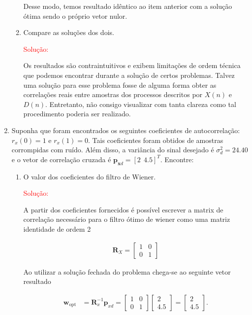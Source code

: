 \documentclass[a4paper,10pt]{article}
\begin{document}
\begin{enumerate}
\begin{enumerate}
						Desse modo, temos resultado idêntico ao item anterior com a solução ótima sendo o próprio vetor nulor.

					\item Compare as soluções dos dois.
					
						\textcolor{red}{Solução:} 

						Os resultados são contraintuitivos e exibem limitações de ordem técnica que podemos encontrar durante a solução de certos problemas. Talvez uma
						solução para esse problema fosse de alguma forma obter as correlações reais entre amostras dos processos descritos por $X(n)$ e $D(n)$. Entretanto, não
						consigo visualizar com tanta clareza como tal procedimento poderia ser realizado.
					
				\end{enumerate}
			
			\item Suponha que foram encontrados os seguintes coeficientes de autocorrelação: $r_x(0) = 1$ e $r_x(1) = 0$. Tais coeficientes foram obtidos de amostras corrompidas com ruído. Além disso, a variância do sinal desejado é $\sigma_d^2 =
			24.40$ e o vetor de correlação cruzada é $\mathbf{p}_{\mathbf{x}d} = [2 \ \ 4.5]^T$. Encontre:
			
				\begin{enumerate}
					
					\item O valor dos coeficientes do filtro de Wiener.
					
						\textcolor{red}{Solução:}
						
						A partir dos coeficientes fornecidos é possível escrever a matrix de correlação necessário para o filtro ótimo de wiener como uma matriz identidade de ordem 2
						
						\begin{align}
							\mathbf{R}_{X} = \left[ \begin{matrix} 1 & 0 \\ 0 & 1 \end{matrix} \right]
						\end{align}
						
						Ao utilizar a solução fechada do problema chega-se ao seguinte vetor resultado
						
						\begin{align}
							\mathbf{w}_{\text{opt}} &= \mathbf{R}^{-1}_{x} \mathbf{p}_{xd} = \left[ \begin{matrix} 1 & 0 \\ 0 & 1 \end{matrix} \right]  \left[ \begin{matrix} 2 \\ 4.5 \end{matrix} \right] = \left[ \begin{matrix} 2 \\ 4.5 \end{matrix} \right].
						\end{align}
					

\end{enumerate}
\end{enumerate}
\end{document}
